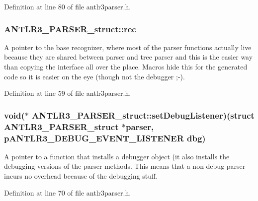 Definition at line 80 of file antlr3parser.\-h.

\hypertarget{struct_a_n_t_l_r3___p_a_r_s_e_r__struct_a6efb97946c9a31a6c4f6585611055d95}{
\subsubsection[{rec}]{ A\-N\-T\-L\-R3\-\_\-\-P\-A\-R\-S\-E\-R\-\_\-struct\-::rec}}\label{struct_a_n_t_l_r3___p_a_r_s_e_r__struct_a6efb97946c9a31a6c4f6585611055d95}
A pointer to the base recognizer, where most of the parser functions actually live because they are shared between parser and tree parser and this is the easier way than copying the interface all over the place. Macros hide this for the generated code so it is easier on the eye (though not the debugger ;-\/). 

Definition at line 59 of file antlr3parser.\-h.

\hypertarget{struct_a_n_t_l_r3___p_a_r_s_e_r__struct_a5f92a481f097af5f5f36097f21c6bf77}{
\subsubsection[{set\-Debug\-Listener}]{\setlength{\rightskip}{0pt plus 5cm}void($\ast$ A\-N\-T\-L\-R3\-\_\-\-P\-A\-R\-S\-E\-R\-\_\-struct\-::set\-Debug\-Listener)(struct {\bf A\-N\-T\-L\-R3\-\_\-\-P\-A\-R\-S\-E\-R\-\_\-struct} $\ast$parser, {\bf p\-A\-N\-T\-L\-R3\-\_\-\-D\-E\-B\-U\-G\-\_\-\-E\-V\-E\-N\-T\-\_\-\-L\-I\-S\-T\-E\-N\-E\-R} dbg)}}\label{struct_a_n_t_l_r3___p_a_r_s_e_r__struct_a5f92a481f097af5f5f36097f21c6bf77}
A pointer to a function that installs a debugger object (it also installs the debugging versions of the parser methods. This means that a non debug parser incurs no overhead because of the debugging stuff. 

Definition at line 70 of file antlr3parser.\-h.


